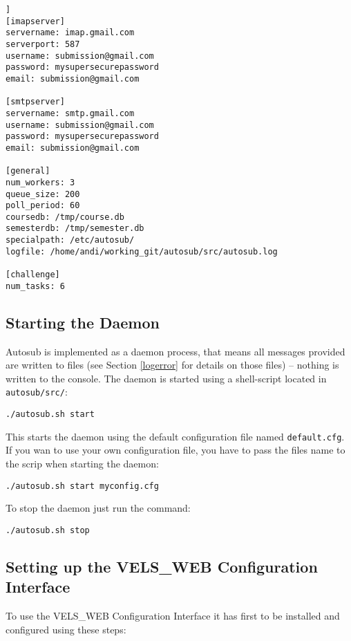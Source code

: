 \begin{lstlisting}[frame=single,captionpos=b,caption=example.cfg, belowcaptionskip=4pt]]
[imapserver]
servername: imap.gmail.com
serverport: 587
username: submission@gmail.com
password: mysupersecurepassword
email: submission@gmail.com

[smtpserver]
servername: smtp.gmail.com
username: submission@gmail.com
password: mysupersecurepassword
email: submission@gmail.com

[general]
num_workers: 3
queue_size: 200
poll_period: 60
coursedb: /tmp/course.db
semesterdb: /tmp/semester.db
specialpath: /etc/autosub/
logfile: /home/andi/working_git/autosub/src/autosub.log

[challenge]
num_tasks: 6
\end{lstlisting}

\subsection{Starting the Daemon}

Autosub is implemented as a daemon process, that means all messages provided are written
to files (see Section \ref{logerror} for details on those files) -- nothing is written to
the console. The daemon is started using a shell-script located in {\tt autosub/src/}:

\begin{verbatim}
./autosub.sh start
\end{verbatim}

This starts the daemon using the default configuration file named {\tt default.cfg}. If you
wan to use your own configuration file, you have to pass the files name to the scrip when
starting the daemon:

\begin{verbatim}
./autosub.sh start myconfig.cfg
\end{verbatim}

To stop the daemon just run the command:

\begin{verbatim}
./autosub.sh stop
\end{verbatim}

\subsection{Setting up the VELS\_WEB Configuration Interface}
To use the VELS\_WEB Configuration Interface it has first to be installed and
configured using these steps:

